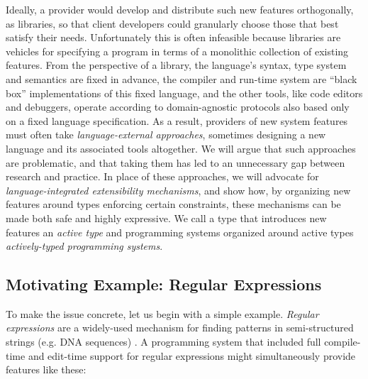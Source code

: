 Ideally, a provider would develop and distribute such new features orthogonally, as libraries, so that client developers could granularly choose those that best satisfy their needs. Unfortunately this is often infeasible because libraries are vehicles for specifying a program in terms of a monolithic collection of existing features. From the perspective of a library, the language's syntax, type system and semantics are fixed in advance, the compiler and run-time system are ``black box'' implementations of this fixed language, and the other tools, like code editors and debuggers, operate according to domain-agnostic protocols also based only on a fixed language specification. As a result, providers of new system features must often take \emph{language-external approaches}, sometimes designing a new language and its associated tools altogether. We will argue that such approaches are problematic, and that taking them has led to an unnecessary gap between research and practice. In place of these approaches, we will advocate for \emph{language-integrated extensibility mechanisms}, and show how, by organizing new features around {types} enforcing certain constraints, these mechanisms can be made both safe and highly expressive. We call a type that introduces new features an \emph{active type} and programming systems organized around active types \emph{actively-typed programming systems}.

\subsection{Motivating Example: Regular Expressions}\label{regex}
To make the issue concrete, let us begin with a simple example. \emph{Regular expressions} are a widely-used mechanism for finding patterns in semi-structured strings (e.g. DNA sequences) \cite{Thompson:1968:PTR:363347.363387}. A programming system that included full compile-time and edit-time support for regular expressions might simultaneously provide features like these:

